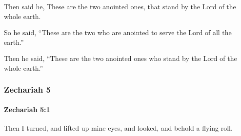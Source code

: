 			\begin{versebox}
					\item[BHS] 
					\item[LXX] 
					\item[ASV] Then said he, These are the two anointed ones, that stand by the Lord of the whole earth.
					\item[NIV] So he said, “These are the two who are anointed to serve the Lord of all the earth.”
					\item[NRSV] Then he said, “These are the two anointed ones who stand by the Lord of the whole earth.”
			\end{versebox}
	\subsubsection{Zechariah 5} %
		\label{ZECHARIAH-5}

		\paragraph{Zechariah 5:1} %
			\label{ZECHARIAH-5-1}

			Then I turned, and lifted up mine eyes, and looked, and behold a flying roll.

